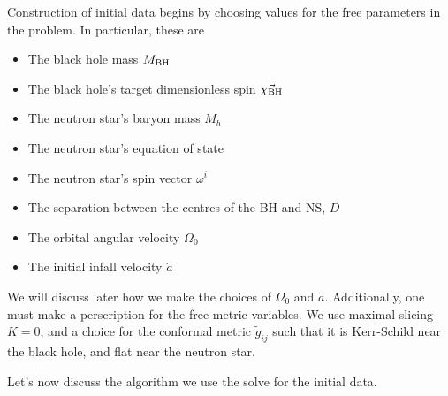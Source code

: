 Construction of initial data begins by choosing values for the free parameters in the problem. In particular, these are
\begin{itemize}
\item The black hole mass $M_{\rm BH}$
\item The black hole's target dimensionless spin $\vec{\chi_{\rm BH}}$
\item The neutron star's baryon mass $M_{b}$
\item The neutron star's equation of state 
\item The neutron star's spin vector $\omega^i$
\item The separation between the centres of the BH and NS, $D$
\item The orbital angular velocity $\Omega_0$
\item The initial infall velocity $\dot{a}$
\end{itemize}
We will discuss later how we make the choices of $\Omega_0$ and $\dot{a}$. Additionally, one must make a perscription for the free metric variables. We use maximal slicing $K=0$, and a choice for the conformal metric $\tilde{g}_{ij}$ such that it is Kerr-Schild near the black hole, and flat near the neutron star.

Let's now discuss the algorithm we use the solve for the initial data. 


